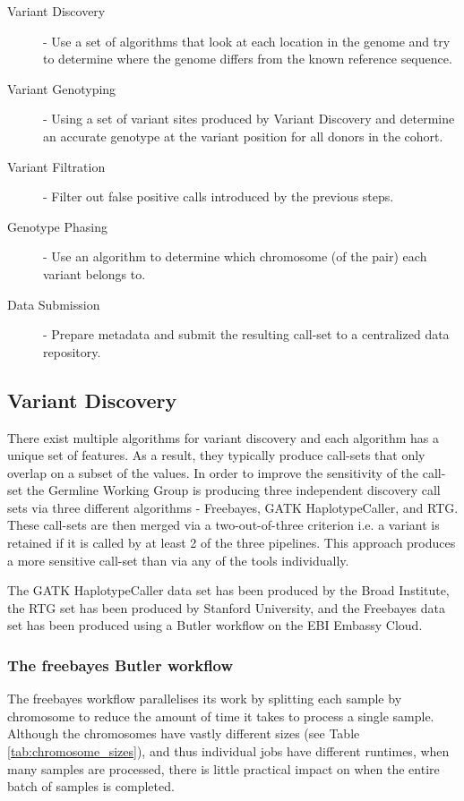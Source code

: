 \begin{description}
\item [Variant Discovery] - Use a set of algorithms that look at each location in the genome and try to determine where the genome differs from the known reference sequence.
\item [Variant Genotyping] - Using a set of variant sites produced by Variant Discovery and determine an accurate genotype at the variant position for all donors in the cohort.
\item [Variant Filtration] - Filter out false positive calls introduced by the previous steps.
\item [Genotype Phasing] - Use an algorithm to determine which chromosome (of the pair) each variant belongs to.
\item [Data Submission] - Prepare metadata and submit the resulting call-set to a centralized data repository.
\end{description}

\subsection{Variant Discovery}
\label{sec:variant_discovery}

There exist multiple algorithms for variant discovery and each algorithm has a unique set of features. As a result, they typically produce call-sets that only overlap on a subset of the values\autocite{li2014towards}. In order to improve the sensitivity of the call-set the Germline Working Group is producing three independent discovery call sets via three different algorithms - Freebayes\autocite{garrison2012haplotype}, GATK HaplotypeCaller\autocite{depristo2011framework}, and RTG\autocite{cleary2014joint}. These call-sets are then merged via a two-out-of-three criterion i.e. a variant is retained if it is called by at least 2 of the three pipelines. This approach produces a more sensitive call-set than via any of the tools individually.

The GATK HaplotypeCaller data set has been produced by the Broad Institute, the RTG set has been produced by Stanford University, and the Freebayes data set has been produced using a Butler workflow on the EBI Embassy Cloud.

\subsubsection{The freebayes Butler workflow}
The freebayes workflow parallelises its work by splitting each sample by chromosome to reduce the amount of time it takes to process a single sample. Although the chromosomes have vastly different sizes (see Table \ref{tab:chromosome_sizes}), and thus individual jobs have different runtimes, when many samples are processed, there is little practical impact on when the entire batch of samples is completed.

